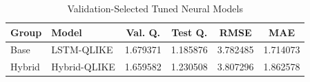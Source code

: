\begin{table}[!t]
\centering
\caption{Validation-Selected Tuned Neural Models}
\label{tab:tuned-selection}
\scriptsize
\setlength{\tabcolsep}{2pt}
\begin{tabular}{@{}>{\raggedright\arraybackslash}p{}
>{\raggedright\arraybackslash}p{}c c c c@{}}
\toprule
Group & Model & Val. Q. & Test Q. & RMSE & MAE \\
\midrule
Base & LSTM-QLIKE & 1.679371 & 1.185876 & 3.782485 & 1.714073 \\
Hybrid & Hybrid-QLIKE & 1.659582 & 1.230508 & 3.807296 & 1.862578 \\
\bottomrule
\end{tabular}
\end{table}
